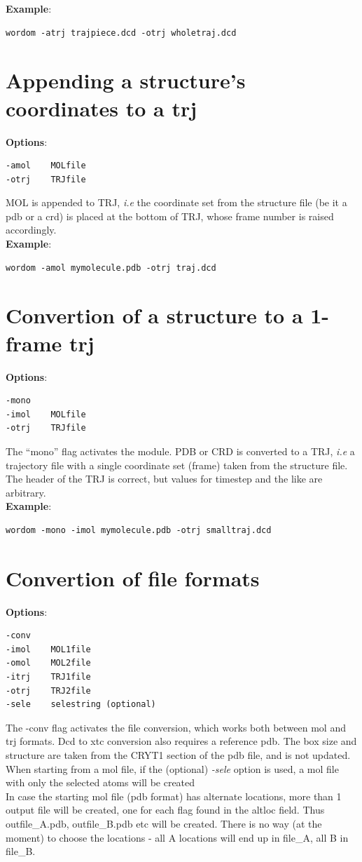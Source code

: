 \documentclass[11pt,twoside,onecolumn,a4paper,openright,notitlepage]{book}[2001/04/21]
\begin{document}
\textbf{\large Example}:
\begin{verbatim}
wordom -atrj trajpiece.dcd -otrj wholetraj.dcd
\end{verbatim}
%
\section{Appending a structure's coordinates to a trj}
\textbf{\large Options}:
\begin{verbatim}
-amol    MOLfile
-otrj    TRJfile     
\end{verbatim}
MOL is appended to TRJ, \emph{i.e} the coordinate set from the structure file (be it a pdb or a crd) is placed at the bottom of TRJ, whose frame number is raised accordingly. \\

\textbf{\large Example}:
\begin{verbatim}
wordom -amol mymolecule.pdb -otrj traj.dcd
\end{verbatim}
%
\section{Convertion of a structure to a 1-frame trj}
\textbf{\large Options}:
\begin{verbatim}
-mono
-imol    MOLfile
-otrj    TRJfile     
\end{verbatim}
The ``mono'' flag activates the module. PDB or CRD is converted to a TRJ, \emph{i.e} a trajectory file with a single coordinate set (frame) taken from the structure file. The header of the TRJ is correct, but values for timestep and the like are arbitrary.\\

\textbf{\large Example}:
\begin{verbatim}
wordom -mono -imol mymolecule.pdb -otrj smalltraj.dcd
\end{verbatim}
%
\section{Convertion of file formats}
\textbf{\large Options}:
\begin{verbatim}
-conv
-imol    MOL1file
-omol    MOL2file
-itrj    TRJ1file
-otrj    TRJ2file
-sele    selestring (optional)
\end{verbatim}
The -conv flag activates the file conversion, which works both between mol and trj formats. Dcd to xtc conversion also requires a reference pdb. The box size and structure are taken from the CRYT1 section of the pdb file, and is not updated. When starting from a mol file, if the (optional) \emph{-sele} option is used, a mol file with only the selected atoms will be created\\
In case the starting mol file (pdb format) has alternate locations, more than 1 output file will be created, one for each flag found in the altloc field. Thus outfile\_A.pdb, outfile\_B.pdb etc will be created. There is no way (at the moment) to choose the locations - all A locations will end up in file\_A, all B in file\_B. \\
\end{document}
